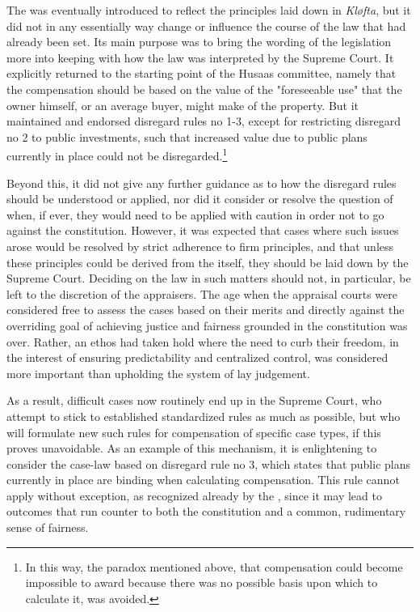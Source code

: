 The \cite{ca84} was eventually introduced to reflect the principles laid down in \emph{Kløfta}, but it did not in any essentially way change or influence the course of the law that had already been set. Its main purpose was to bring the wording of the legislation more into keeping with how the law was interpreted by the Supreme Court. It explicitly returned to the starting point of the Husaas committee, namely that the compensation should be based on the value of the "foreseeable use" that the owner himself, or an average buyer, might make of the property. But it maintained and endorsed disregard rules no 1-3, except for restricting disregard no 2 to public investments, such that increased value due to public plans currently in place could not be disregarded.\footnote{In this way, the paradox mentioned above, that compensation could become impossible to award because there was no possible basis upon which to calculate it, was avoided.}

Beyond this, it did not give any further guidance as to how the disregard rules should be understood or applied, nor did it consider or resolve the question of when, if ever, they would need to be applied with caution in order not to go against the constitution. However, it was expected that cases where such issues arose would be resolved by strict adherence to firm principles, and that unless these principles could be derived from the \cite{ca84} itself, they should be laid down by the Supreme Court. Deciding on the law in such matters should not, in particular, be left to the discretion of the appraisers. The age when the appraisal courts were considered free to assess the cases based on their merits and directly against the overriding goal of achieving justice and fairness grounded in the constitution was over. Rather, an ethos had taken hold where the need to curb their freedom, in the interest of ensuring predictability and centralized control, was considered more important than upholding the system of lay judgement. 

As a result, difficult cases now routinely end up in the Supreme Court, who attempt to stick to established standardized rules as much as possible, but who will formulate new such rules for compensation of specific case types, if this proves unavoidable. As an example of this mechanism, it is enlightening to consider the case-law based on disregard rule no 3, which states that public plans currently in place are binding when calculating compensation. This rule cannot apply without exception, as recognized already by the \cite{ca73}, since it may lead to outcomes that run counter to both the constitution and a common, rudimentary sense of fairness. 

